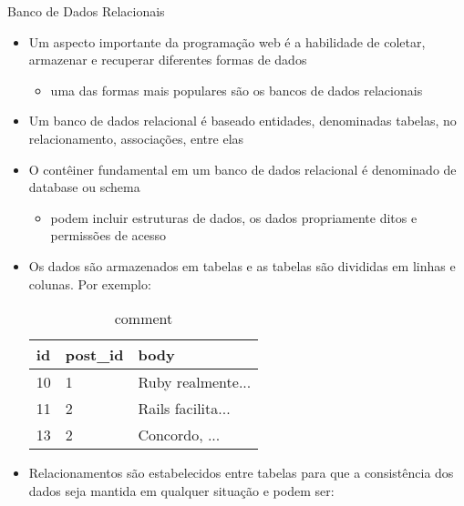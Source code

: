\begin{frame}{Banco de Dados Relacionais}
	\begin{itemize}
		\item Um aspecto importante da programação web é a habilidade de coletar, armazenar e recuperar
		diferentes formas de dados
		\begin{itemize}
			\item uma das formas mais populares são os \alert{bancos de dados relacionais}
		\end{itemize} 
		\item Um banco de dados relacional é baseado entidades, denominadas \alert{tabelas}, no
		relacionamento, \alert{associações}, entre elas
		\item O contêiner fundamental em um banco de dados relacional é denominado de \alert{database} ou \alert{schema}
		\begin{itemize}
			\item podem incluir estruturas de dados, os dados propriamente ditos e permissões de acesso
		\end{itemize}  
		\framebreak
		\item Os dados são armazenados em \alert{tabelas} e as tabelas são divididas em \alert{linhas} e \alert{colunas}.
		Por exemplo:
		\begin{table}[tp] 
			\scriptsize 
			\caption{comment}
			\setlength{\tabcolsep}{8pt}
			\setlength{\extrarowheight}{2pt}   			
			\begin{tabular}{|l|l|l|} 
				\hline
				\textbf{id} & \textbf{post\_id} & \textbf{body}\\
				\hline
				10 & 1 & Ruby realmente... \\
				\hline
				11 & 2 & Rails facilita... \\
				\hline
				13 & 2 & Concordo, ... \\
				\hline
			\end{tabular}
		\end{table}
		\pagebreak
		\item Relacionamentos são estabelecidos entre tabelas para que a consistência dos dados
		seja mantida em qualquer situação e podem ser:
		\begin{itemize}

\end{itemize}
\end{itemize}
\end{frame}
